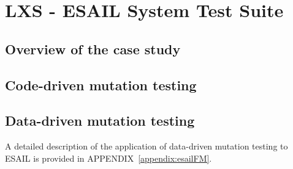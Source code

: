 
\section{LXS - ESAIL System Test Suite}
\label{chapter:caseStudies:LXS}

\subsection{Overview of the case study}

\subsection{Code-driven mutation testing}

\subsection{Data-driven mutation testing}

A detailed description of the application of data-driven mutation testing to ESAIL is provided in APPENDIX~\ref{appendix:esailFM}.

